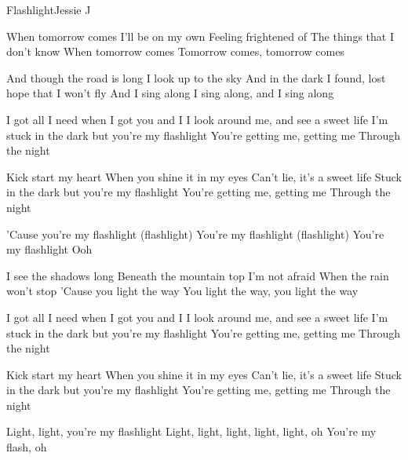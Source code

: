 \begin{Song}{Flashlight}{Jessie J}
\begin{multicols}{2}

\begin{Verse}
When tomorrow comes
I'll be on my own
Feeling frightened of
The things that I don't know
When tomorrow comes
Tomorrow comes, tomorrow comes
\espaceInterStrophe

And though the road is long
I look up to the sky
And in the dark I found,
lost hope that I won't fly
And I sing along
I sing along, and I sing along
\end{Verse}
\espaceInterStrophe

\begin{Chorus}
I got all I need when I got you and I
I look around me, and see a sweet life
I'm stuck in the dark but you're my flashlight
You're getting me, getting me
Through the night
\espaceInterStrophe

Kick start my heart
When you shine it in my eyes
Can't lie, it's a sweet life
Stuck in the dark but you're my flashlight
You're getting me, getting me
Through the night
\espaceInterStrophe

'Cause you're my flashlight (flashlight)
You're my flashlight (flashlight)
You're my flashlight
Ooh
\end{Chorus}
\columnbreak

\begin{Verse}
I see the shadows long
Beneath the mountain top
I'm not afraid
When the rain won't stop
'Cause you light the way
You light the way, you light the way
\end{Verse}
\espaceInterStrophe

\begin{Chorus}
I got all I need when I got you and I
I look around me, and see a sweet life
I'm stuck in the dark but you're my flashlight
You're getting me, getting me
Through the night
\espaceInterStrophe

Kick start my heart
When you shine it in my eyes
Can't lie, it's a sweet life
Stuck in the dark but you're my flashlight
You're getting me, getting me
Through the night
\espaceInterStrophe

Light, light, you're my flashlight
Light, light, light, light, light, oh
You're my flash, oh
\end{Chorus}
\espaceInterStrophe

\tochorus
\vfill
~


\end{multicols}
\end{Song}
